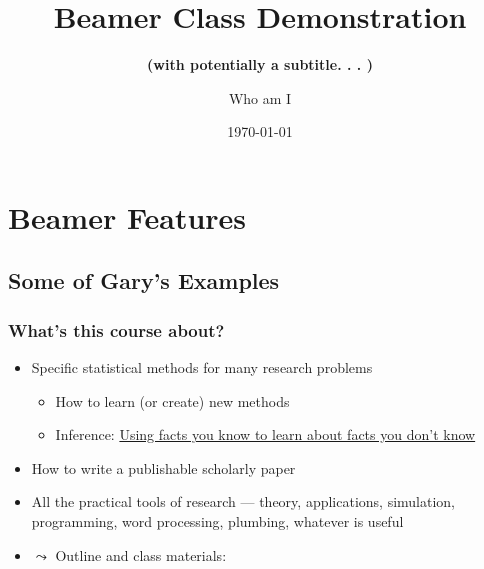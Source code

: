\documentclass[aspectratio=169]{beamer}
\title[Beamer Demo]{Beamer Class Demonstration}%
\subtitle{\textbf{(with potentially a subtitle. . . )}}
\author{Who am I}
\date{\today}
\institute{IQSS}
\begin{document}
    \frame[plain]{\titlepage}


    \section[Features]{Beamer Features}

    \subsection{Some of Gary's Examples}
    \begin{frame}
        \frametitle{What's this course about?}

        \begin{itemize}
            \item \alert{Specific statistical methods for many research problems}
            \begin{itemize}
                \item How to learn (or create) new methods
                \item Inference: \underline{Using facts you know to learn about
                facts you don't know}
            \end{itemize}
            \item \alert{How to write a publishable scholarly paper}
            \item \alert{All the practical tools of research} --- theory,
            applications, simulation, programming, word processing, plumbing,
            whatever is useful
            \item $\leadsto$ \alert{Outline and class materials:}
        \end{itemize}
    \end{frame}
\end{document}
